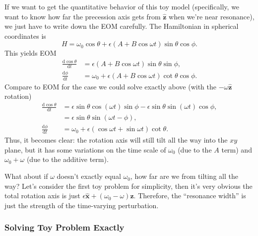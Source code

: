\documentclass[11pt,
        usenames, %
        dvipsnames %
    ]{article}
\newcommand*{\rd}[2]{\frac{\mathrm{d}#1}{\mathrm{d}#2}}
\newcommand*{\bm}[1]{\boldsymbol{\mathbf{#1}}}
\newcommand*{\uv}[1]{\hat{\bm{#1}}}
\newcommand*{\p}[1]{\left(#1\right)}
\begin{document}
If we want to get the quantitative behavior of this toy model (specifically, we
want to know how far the precession axis gets from $\uv{z}$ when we're near
resonance), we just have to write down the EOM carefully. The Hamiltonian in
spherical coordinates is
\begin{equation}
    H = \omega_0 \cos \theta + \epsilon \p{A + B \cos \omega t} \sin \theta \cos
        \phi.
\end{equation}
This yields EOM
\begin{align}
    \rd{\cos \theta}{t} &= \epsilon \p{A + B \cos \omega t}\sin \theta \sin \phi,\\
    \rd{\phi}{t} &= \omega_0 + \epsilon\p{A + B \cos \omega t}\cot \theta \cos
        \phi.
\end{align}
Compare to EOM for the case we could solve exactly above (with the $-\omega
\uv{z}$ rotation)
\begin{align}
    \rd{\cos \theta}{t} &= \epsilon \sin \theta \cos\p{\omega t} \sin \phi
            - \epsilon \sin \theta \sin \p{\omega t}\cos \phi,\\
        &= \epsilon \sin \theta \sin\p{\omega t - \phi},\\
    \rd{\phi}{t} &= \omega_0 + \epsilon\p{\cos \omega t + \sin \omega t}\cot
        \theta.
\end{align}
Thus, it becomes clear: the rotation axis will still tilt all the way into the
$xy$ plane, but it has some variations on the time scale of $\omega_0$ (due to
the $A$ term) and $\omega_0 + \omega$ (due to the additive term).

What about if $\omega$ doesn't exactly equal $\omega_0$, how far are we from
tilting all the way? Let's consider the first toy problem for simplicity, then
it's very obvious the total rotation axis is just $\epsilon \uv{x} + \p{\omega_0
- \omega}\uv{z}$. Therefore, the ``resonance width'' is just the strength of the
time-varying perturbation.

\subsubsection{Solving Toy Problem Exactly}
\end{document}
